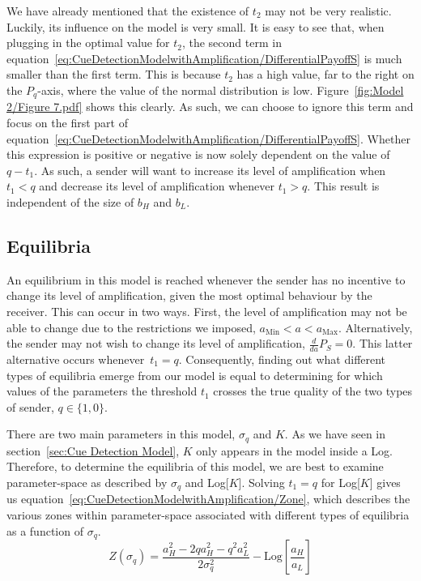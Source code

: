 \documentclass[a4paper,12pt]{article}
\numberwithin{equation}{section}
\begin{document}
We have already mentioned that the existence of $t_{2}$ may not be very realistic. Luckily, its influence on the model is very small. It is easy to see that, when plugging in the optimal value for $t_{2}$, the second term in equation~\ref{eq:CueDetectionModelwithAmplification/DifferentialPayoffS} is much smaller than the first term. This is because $t_{2}$ has a high value, far to the right on the $P_{q}$-axis, where the value of the normal distribution is low. Figure~\ref{fig:Model 2/Figure 7.pdf} shows this clearly. As such, we can choose to ignore this term and focus on the first part of equation~\ref{eq:CueDetectionModelwithAmplification/DifferentialPayoffS}. Whether this expression is positive or negative is now solely dependent on the value of $q-t_{1}$. As such, a sender will want to increase its level of amplification when $t_{1}<q$ and decrease its level of amplification whenever $t_{1}>q$. This result is independent of the size of $b_{H}$ and $b_{L}$.


\subsection{Equilibria}
\label{sec:CueDetectionModelwithAmplification/Equilibria}

An equilibrium in this model is reached whenever the sender has no incentive to change its level of amplification, given the most optimal behaviour by the receiver. This can occur in two ways. First, the level of amplification may not be able to change due to the restrictions we imposed, $a_{\text{Min}}<a<a_{\text{Max}}$. Alternatively, the sender may not wish to change its level of amplification, $\frac{d}{da} P_{S}=0$. This latter alternative occurs whenever~$t_{1}=q$. Consequently, finding out what different types of equilibria emerge from our model is equal to determining for which values of the parameters the threshold $t_{1}$ crosses the true quality of the two types of sender, $q \in \{1, 0\}$.

There are two main parameters in this model, $\sigma_{q}$ and $K$. As we have seen in section~\ref{sec:Cue Detection Model}, $K$ only appears in the model inside a Log. Therefore, to determine the equilibria of this model, we are best to examine parameter-space as described by $\sigma_{q}$ and Log[$K$]. Solving $t_{1}=q$ for Log[$K$] gives us equation~\ref{eq:CueDetectionModelwithAmplification/Zone}, which describes the various zones within parameter-space associated with different types of equilibria as a function of $\sigma_{q}$.
\begin{equation}
\label{eq:CueDetectionModelwithAmplification/Zone}
Z(\sigma_{q})=\frac{a_{H}^{2} - 2 q a_{H}^{2}- q^{2} a_{L}^{2}}{2 \sigma_{q}^{2}} - \text{Log}[\frac{a_{H}}{a_{L}}]
\end{equation}
\end{document}
